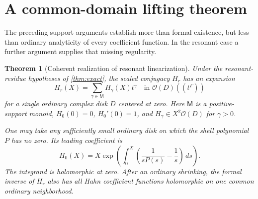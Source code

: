 \documentclass[11pt,letterpaper]{article}
\numberwithin{equation}{section}
\theoremstyle{plain}
\newtheorem{theorem}{Theorem}[section]
\theoremstyle{definition}
\theoremstyle{remark}
\newcommand{\OO}{\mathcal O}
\newcommand{\M}{\mathsf M}
\begin{document}
\section{A common-domain lifting theorem}\label{sec:coherent}

The preceding support arguments establish more than formal existence, but
less than ordinary analyticity of every coefficient function. In the resonant
case a further argument supplies that missing regularity.

\begin{theorem}[Coherent realization of resonant linearization]\label{thm:coherent}
Under the resonant-residue hypotheses of \cref{thm:exact}, the scaled
conjugacy $H_r$ has an expansion
\begin{equation}\label{eq:coherent-expansion}
 H_r(X)=\sum_{\gamma\in\M}H_\gamma(X)t^\gamma
       \quad\text{in }\OO(D)((t^\Gamma))
\end{equation}
for a single ordinary complex disk $D$ centered at zero. Here $\M$ is a
positive-support monoid, $H_0(0)=0$, $H_0'(0)=1$, and
$H_\gamma\in X^2\OO(D)$ for $\gamma>0$.

One may take any sufficiently small ordinary disk on which the shell
polynomial $P$ has no zero. Its leading coefficient is
\begin{equation}\label{eq:H0}
 \boxed{\displaystyle
 H_0(X)=X\exp\left(\int_0^X
       \left(\frac1{sP(s)}-\frac1s\right)\,ds\right).}
\end{equation}
The integrand is holomorphic at zero. After an ordinary shrinking, the formal
inverse of $H_r$ also has all Hahn coefficient functions holomorphic on one
common ordinary neighborhood.
\end{theorem}
\end{document}
